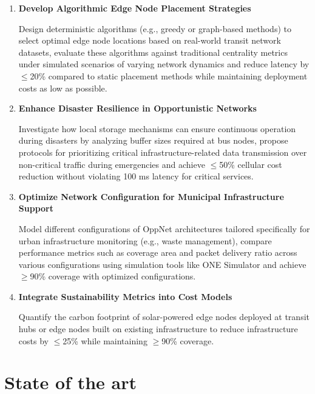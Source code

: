 \documentclass[12pt,a4paper]{report}
\begin{document}
\begin{enumerate}
	\item \textbf{Develop Algorithmic Edge Node Placement Strategies}
\par Design deterministic algorithms (e.g., greedy or graph-based methods) to select
optimal edge node locations based on real-world transit network datasets, evaluate
these algorithms against traditional centrality metrics under simulated
scenarios of varying network dynamics and reduce latency by $\leq$20\% compared
to static placement methods while maintaining deployment costs as low as possible.\\
	\item \textbf{Enhance Disaster Resilience in Opportunistic Networks}
\par Investigate how local storage mechanisms can ensure continuous operation
during disasters by analyzing buffer sizes required at bus nodes, propose protocols
for prioritizing critical infrastructure-related data transmission over non-critical
traffic during emergencies and achieve $\leq$50\% cellular cost reduction without
violating 100 ms latency for critical services.\\
	\item \textbf{Optimize Network Configuration for Municipal Infrastructure Support}
\par Model different configurations of OppNet architectures tailored specifically
for urban infrastructure monitoring (e.g., waste management), compare performance metrics
such as coverage area and packet delivery ratio across various configurations using
simulation tools like ONE Simulator and achieve $\geq$90\% coverage with optimized
configurations.\\
	\item \textbf{Integrate Sustainability Metrics into Cost Models}
\par Quantify the carbon footprint of solar-powered edge nodes deployed at transit hubs
or edge nodes built on existing infrastructure to reduce infrastructure costs by
$\leq$25\% while maintaining $\geq$90\% coverage.
\end{enumerate}


\chapter{State of the art}
\end{document}
